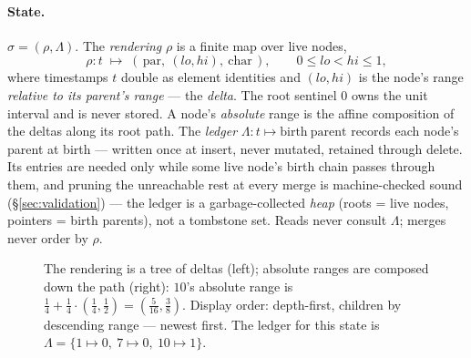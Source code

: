 \documentclass[11pt]{article}
\begin{document}
\paragraph{State.} $\sigma = (\rho, \Lambda)$.
The \emph{rendering} $\rho$ is a finite map over live nodes,
\[
  \rho : t \;\mapsto\; (\,\mathrm{par},\ (lo, hi),\ \mathrm{char}\,),
  \qquad 0 \le lo < hi \le 1 ,
\]
where timestamps $t$ double as element identities and $(lo,hi)$ is the
node's range \emph{relative to its parent's range} --- the \emph{delta}.
The root sentinel $0$ owns the unit interval and is never stored. A node's
\emph{absolute} range is the affine composition of the deltas along its
root path. The \emph{ledger} $\Lambda : t \mapsto \mathrm{birth\ parent}$
records each node's parent at birth --- written once at insert, never
mutated, retained through delete. Its entries are needed only while some
live node's birth chain passes through them, and pruning the unreachable
rest at every merge is machine-checked sound (\S\ref{sec:validation}) ---
the ledger is a garbage-collected \emph{heap} (roots = live nodes,
pointers = birth parents), not a tombstone set. Reads never consult
$\Lambda$; merges never order by $\rho$.

\begin{figure}[h]
\centering
{}
\caption{The rendering is a tree of deltas (left); absolute ranges are
composed down the path (right): $10$'s absolute range is
$\tfrac14 + \tfrac14\cdot(\tfrac14,\tfrac12) = (\tfrac{5}{16},\tfrac38)$.
Display order: depth-first, children by descending range --- newest first.
The ledger for this state is $\Lambda = \{1 \mapsto 0,\ 7 \mapsto 0,\
10 \mapsto 1\}$.}
\label{fig:state}
\end{figure}
\end{document}
